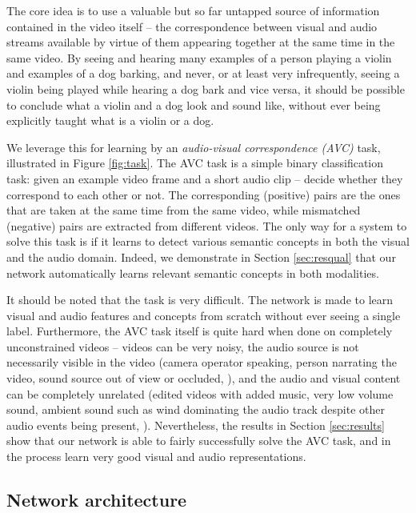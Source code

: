 \documentclass[10pt,twocolumn,letterpaper]{article}
\begin{document}
The core idea is to use a valuable but so far
untapped source of information contained in the video itself --
the correspondence between visual and audio streams available by
virtue of them appearing together at the same time in the same video.
By seeing and hearing many examples of a person playing a violin
and examples of a dog barking, and never, or at least very infrequently,
seeing a violin being played while hearing a dog bark and vice versa,
it should be possible to conclude what a violin and a dog look and sound
like, without ever being explicitly taught what is a violin or a dog.

\figTask

We leverage this for learning by an
\emph{audio-visual correspondence (AVC)}
task, illustrated in Figure \ref{fig:task}.
The AVC task is a simple binary classification task:
given an example video frame and a short audio clip -- decide whether
they correspond to each other or not. The corresponding (positive) pairs
are the ones that are taken at the same time from the same video,
while mismatched (negative) pairs are extracted from different videos.
The only way for a system to solve this task is if it learns
to detect various semantic concepts in both the visual and the audio domain.
Indeed, we demonstrate in Section \ref{sec:resqual} that our network
automatically learns relevant semantic concepts in both modalities.


It should be noted that the task is very difficult.
The network is made to learn visual and audio features and concepts from
scratch without ever seeing a single label.
Furthermore, the AVC task itself is quite hard when done on
completely unconstrained videos -- videos can be very noisy,
the audio source is not necessarily visible in the video
(\eg camera operator speaking, person narrating the video,
sound source out of view or occluded, \etc),
and the audio and visual content can be completely unrelated
(\eg edited videos with added music, very low volume sound,
ambient sound such as wind dominating the audio track despite
other audio events being present, \etc).
Nevertheless, the results in Section \ref{sec:results} show that our network
is able to fairly successfully solve the AVC task, and in the process
learn very good visual and audio representations.


\subsection{Network architecture}
\label{sec:network}
\end{document}
